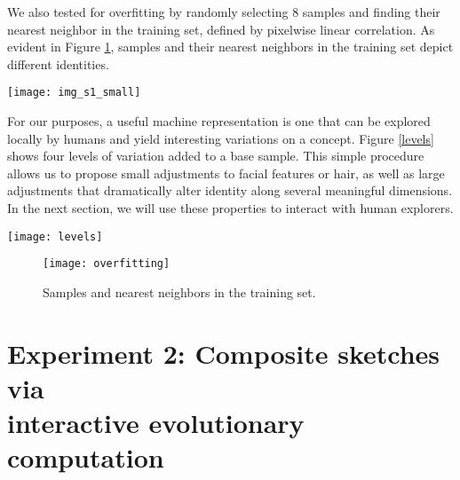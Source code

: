 \documentclass[10pt,letterpaper]{article}
\begin{document}
We also tested for overfitting by randomly selecting 8 samples and finding their nearest neighbor in the training set, defined by pixelwise linear correlation. As evident in Figure \ref{overfitting}, samples and their nearest neighbors in the training set depict different identities.

\begin{figure*}[!h]
  \begin{center}
    \texttt{[image: img\_s1\_small]}
  \vspace{-2mm}
  \caption{\textbf{a.} Decoded random samples drawn from the prior. \textbf{b.} Three decoded $7$-point linear interpolations between two random samples drawn from the prior.}
  \label{upsampled_samples}
  \end{center}
\end{figure*}

For our purposes, a useful machine representation is one that can be explored locally by humans and yield interesting variations on a concept. Figure \ref{levels} shows four levels of variation added to a base sample. This simple procedure allows us to propose small adjustments to facial features or hair, as well as large adjustments that dramatically alter identity along several meaningful dimensions. In the next section, we will use these properties to interact with human explorers.

\begin{figure*}[!ht]
  \begin{center}
    \texttt{[image: levels]}
  \vspace{-7mm}
  \caption{Latent noise perturbations at four levels of intensity.}
  \label{levels}
  \end{center}
  \vspace{-3mm}
\end{figure*}

\begin{figure}[!ht]
  \begin{center}
    \texttt{[image: overfitting]}
  \vspace{-3mm}
  \caption{Samples and nearest neighbors in the training set.}
  \label{overfitting}
  \end{center}
  \vspace{-7mm}
\end{figure}

\section{Experiment 2: Composite sketches via\\ interactive evolutionary computation}
\end{document}
